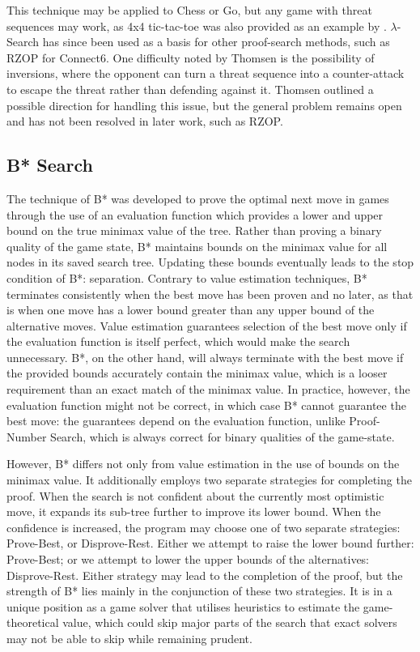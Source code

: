 This technique may be applied to Chess or Go, but any game with threat sequences may work, as 4x4 tic-tac-toe was also provided as an example by . $\lambda$-Search has since been used as a basis for other proof-search methods, such as RZOP \cite{Wu2010} for Connect6. One difficulty noted by Thomsen is the possibility of inversions, where the opponent can turn a threat sequence into a counter-attack to escape the threat rather than defending against it. Thomsen outlined a possible direction for handling this issue, but the general problem remains open and has not been resolved in later work, such as RZOP.

\subsection{B* Search}
\label{subsec:introBstar}
The technique of B* \cite{Berliner1979} was developed to prove the optimal next move in games through the use of an evaluation function which provides a lower and upper bound on the true minimax value of the tree. Rather than proving a binary quality of the game state, B* maintains bounds on the minimax value for all nodes in its saved search tree. Updating these bounds eventually leads to the stop condition of B*: separation. Contrary to value estimation techniques, B* terminates consistently when the best move has been proven and no later, as that is when one move has a lower bound greater than any upper bound of the alternative moves. Value estimation guarantees selection of the best move only if the evaluation function is itself perfect, which would make the search unnecessary. B*, on the other hand, will always terminate with the best move if the provided bounds accurately contain the minimax value, which is a looser requirement than an exact match of the minimax value. In practice, however, the evaluation function might not be correct, in which case B* cannot guarantee the best move: the guarantees depend on the evaluation function, unlike Proof-Number Search, which is always correct for binary qualities of the game-state.

However, B* differs not only from value estimation in the use of bounds on the minimax value. It additionally employs two separate strategies for completing the proof. When the search is not confident about the currently most optimistic move, it expands its sub-tree further to improve its lower bound. When the confidence is increased, the program may choose one of two separate strategies: Prove-Best, or Disprove-Rest. Either we attempt to raise the lower bound further: Prove-Best; or we attempt to lower the upper bounds of the alternatives: Disprove-Rest. Either strategy may lead to the completion of the proof, but the strength of B* lies mainly in the conjunction of these two strategies. It is in a unique position as a game solver that utilises heuristics to estimate the game-theoretical value, which could skip major parts of the search that exact solvers may not be able to skip while remaining prudent.

